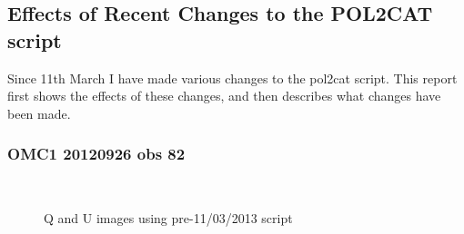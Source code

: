 \documentclass[twoside,11pt]{starlink}
\begin{document}
\subsection{Effects of Recent Changes to the POL2CAT script}
Since 11th March I have made various changes to the pol2cat script. This
report first shows the effects of these changes, and then describes what
changes have been made.

\subsubsection{OMC1 20120926 obs 82}

\begin{figure}[H]
\centering
{}
\hspace*{10pt}
\\
\caption{Q and U images using pre-11/03/2013 script}
\label{fig:APpic12b}
\end{figure}
\end{document}
